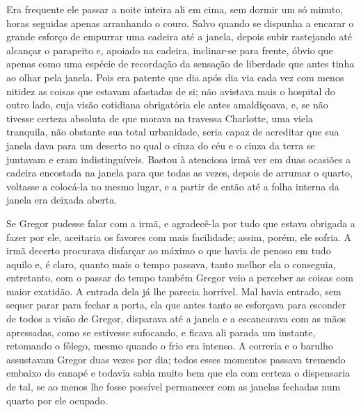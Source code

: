 Era frequente ele passar a noite inteira ali em cima, sem dormir um só
minuto, horas seguidas apenas arranhando o couro. Salvo quando se dispunha
a encarar o grande esforço de empurrar uma cadeira até a janela, depois
subir rastejando até alcançar o parapeito e, apoiado na cadeira,
inclinar-se para frente, óbvio que apenas como uma espécie de recordação
da sensação de liberdade que antes tinha ao olhar pela janela. Pois era
patente que dia após dia via cada vez com menos nitidez as coisas que
estavam afastadas de si; não avistava mais o hospital do outro lado, cuja
visão cotidiana obrigatória ele antes amaldiçoava, e, se não tivesse
certeza absoluta de que morava na travessa Charlotte, uma viela tranquila,
não obstante sua total urbanidade, seria capaz de acreditar que sua janela
dava para um deserto no qual o cinza do céu e o cinza da terra se juntavam
e eram indistinguíveis. Bastou à atenciosa irmã ver em duas ocasiões a
cadeira encostada na janela para que todas as vezes, depois de arrumar o
quarto, voltasse a colocá-la no mesmo lugar, e a partir de então até a
folha interna da janela era deixada aberta.

Se Gregor pudesse falar com a irmã, e agradecê-la por tudo que estava
obrigada a fazer por ele, aceitaria os favores com mais facilidade; assim,
porém, ele sofria. A irmã decerto procurava disfarçar ao máximo o que
havia de penoso em tudo aquilo e, é claro, quanto mais o tempo passava,
tanto melhor ela o conseguia, entretanto, com o passar do tempo também
Gregor veio a perceber as coisas com maior exatidão. A entrada dela já lhe
parecia horrível. Mal havia entrado, sem sequer parar para fechar a porta,
ela que antes tanto se esforçava para esconder de todos a visão de Gregor,
disparava até a janela e a escancarava com as mãos apressadas, como se
estivesse sufocando, e ficava ali parada um instante, retomando o fôlego,
mesmo quando o frio era intenso. A correria e o barulho assustavam Gregor
duas vezes por dia; todos esses momentos passava tremendo embaixo do
canapé e todavia sabia muito bem que ela com certeza o dispensaria de tal,
se ao menos lhe fosse possível permanecer com as janelas fechadas num
quarto por ele ocupado.

